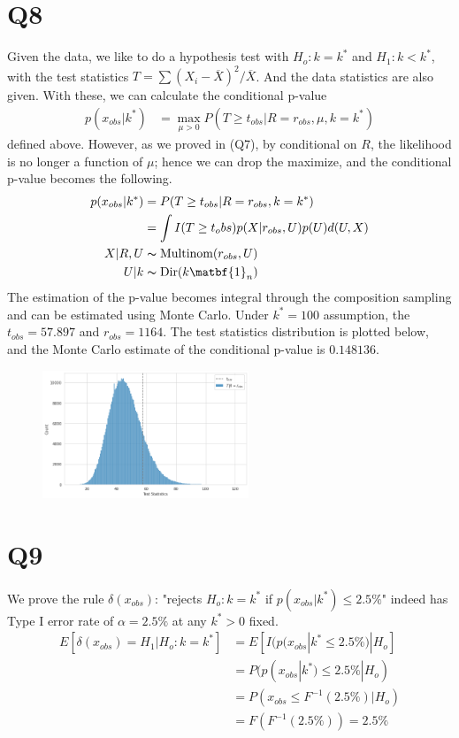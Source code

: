 \documentclass[11pt, letterpaper]{article}
\begin{document}
\section{Q8}
Given the data, we like to do a hypothesis test with $H_o: k = k^*$ and $H_1: k < k^*$, with the test statistics $T = \sum(X_i-\overline{X})^2/\overline{X}$. And the data statistics are also given. With these, we can calculate the conditional p-value
\begin{align*}
    p(x_{obs}|k^*) &= \mathop{max}_{\mu>0} P(T\ge t_{obs}|R=r_{obs}, \mu, k=k^*)
\end{align*}
defined above. However, as we proved in (Q7), by conditional on $R$, the likelihood is no longer a function of $\mu$; hence we can drop the maximize, and the conditional p-value becomes the following.
\begin{align*}
    p(x_{obs}|k^*) &= P(T\ge t_{obs}|R=r_{obs}, k=k^*) \\
        &= \int I(T\ge t_obs) p(X|r_{obs}, U) p(U) d(U, X) \\
        X|R, U &\thicksim \text{Multinom}(r_{obs}, U) \\
        U|k &\thicksim \text{Dir}(k\matbf{1}_n)
\end{align*}
The estimation of the p-value becomes integral through the composition sampling and can be estimated using Monte Carlo. Under $k^* = 100$ assumption, the $t_{obs} = 57.897$ and $r_{obs} = 1164$. The test statistics distribution is plotted below, and the Monte Carlo estimate of the conditional p-value is $0.148136$.

\begin{figure}[!h]
  \centering
  \includegraphics[width=0.55\textwidth]{midterm-1.png}
  \captionsetup{justification=centering}
\end{figure}

\newpage
\section{Q9}
We prove the rule $\delta(x_{obs})$: "rejects $H_o: k = k^*$ if $p(x_{obs}|k^*) \le 2.5\%$" indeed has Type I error rate of $\alpha = 2.5\%$ at any $k^* > 0$ fixed.
\begin{align*}
    E[\delta(x_{obs}) = H_1|H_o:k=k^*] &= E[I(p(x_{obs}|k^* \le 2.5\%) | H_o] \\
        &= P(p(x_{obs}|k^*) \le 2.5\% | H_o) \\
        &= P(x_{obs} \le F^{-1}(2.5\%) | H_o) \\
        &= F(F^{-1}(2.5\%)) = 2.5\%
\end{align*}
\end{document}
